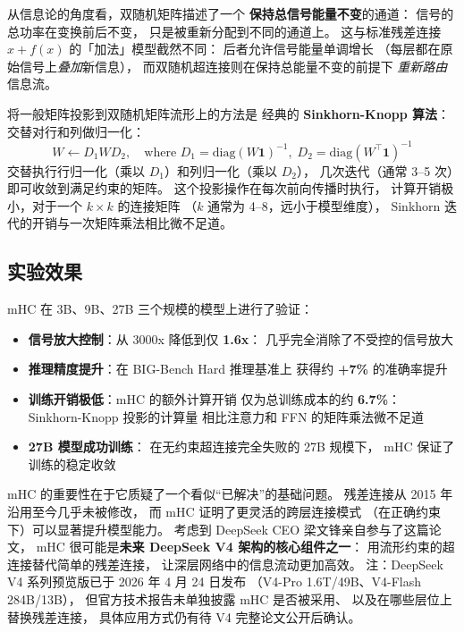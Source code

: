 从信息论的角度看，双随机矩阵描述了一个
\textbf{保持总信号能量不变}的通道：
信号的总功率在变换前后不变，
只是被重新分配到不同的通道上。
这与标准残差连接 $x + f(x)$ 的「加法」模型截然不同：
后者允许信号能量单调增长
（每层都在原始信号上\emph{叠加}新信息），
而双随机超连接则在保持总能量不变的前提下
\emph{重新路由}信息流。

将一般矩阵投影到双随机矩阵流形上的方法是
经典的 \textbf{Sinkhorn-Knopp 算法}：
交替对行和列做归一化：
\[
  W \leftarrow D_1 W D_2, \quad
  \text{where } D_1 = \mathrm{diag}(W\mathbf{1})^{-1}, \;
  D_2 = \mathrm{diag}(W^\top\mathbf{1})^{-1}
\]
交替执行行归一化（乘以 $D_1$）和列归一化（乘以 $D_2$），
几次迭代（通常 3--5 次）即可收敛到满足约束的矩阵。
这个投影操作在每次前向传播时执行，
计算开销极小，对于一个 $k \times k$ 的连接矩阵
（$k$ 通常为 4--8，远小于模型维度），
Sinkhorn 迭代的开销与一次矩阵乘法相比微不足道。

\subsection{实验效果}

mHC 在 3B、9B、27B 三个规模的模型上进行了验证：

\begin{itemize}[noitemsep]
  \item \textbf{信号放大控制}：从 3000x 降低到仅 \textbf{1.6x}：
        几乎完全消除了不受控的信号放大
  \item \textbf{推理精度提升}：在 BIG-Bench Hard 推理基准上
        获得约 \textbf{+7\%} 的准确率提升
  \item \textbf{训练开销极低}：mHC 的额外计算开销
        仅为总训练成本的约 \textbf{6.7\%}：
        Sinkhorn-Knopp 投影的计算量
        相比注意力和 FFN 的矩阵乘法微不足道
  \item \textbf{27B 模型成功训练}：
        在无约束超连接完全失败的 27B 规模下，
        mHC 保证了训练的稳定收敛
\end{itemize}

\begin{corebox}
mHC 的重要性在于它质疑了一个看似“已解决”的基础问题。
残差连接从 2015 年沿用至今几乎未被修改，
而 mHC 证明了更灵活的跨层连接模式
（在正确约束下）可以显著提升模型能力。
考虑到 DeepSeek CEO 梁文锋亲自参与了这篇论文，
mHC 很可能是\textbf{未来 DeepSeek V4 架构的核心组件之一}：
用流形约束的超连接替代简单的残差连接，
让深层网络中的信息流动更加高效。
注：DeepSeek V4 系列预览版已于 2026 年 4 月 24 日发布
（V4-Pro 1.6T/49B、V4-Flash 284B/13B），
但官方技术报告未单独披露 mHC 是否被采用、
以及在哪些层位上替换残差连接，
具体应用方式仍有待 V4 完整论文公开后确认。
\end{corebox}

